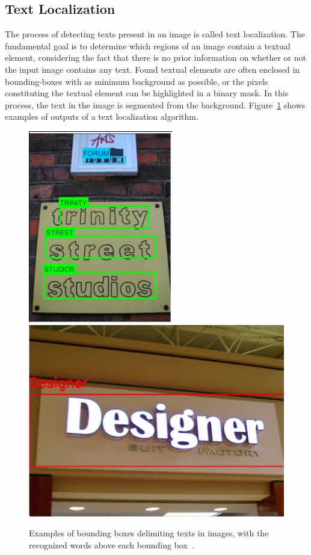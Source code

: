     \subsection{Text Localization}
    The process of detecting texts present in an image is called text localization. The fundamental goal is to determine which regions of an image contain a textual element, considering the fact that there is no prior information on whether or not the input image contains any text. Found textual elements are often enclosed in bounding-boxes with as minimum background as possible, or the pixels constituting the textual element can be highlighted in a binary mask. In this process, the text in the image is segmented from the background. Figure~\ref{fig:bbox-example} shows examples of outputs of a text localization algorithm\cite{wang2011}.
    \begin{figure}[h!]
        \centering
    	\includegraphics[height=0.25\textheight]{related_work/figs/example_text_recognition.png}
    	\includegraphics[height=0.25\textheight]{related_work/figs/example_text_recognition2.png}
    	\caption{Examples of bounding boxes delimiting texts in images, with the recognized words above each bounding box~\cite{wang2011}.}
    	\label{fig:bbox-example}
    \end{figure}
    
